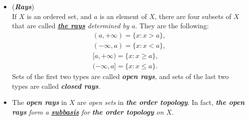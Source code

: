 \documentclass[11pt]{article}
\begin{document}
\begin{itemize}
\item  \begin{definition}(\emph{\textbf{Rays}})\\
If $X$ is an ordered set, and $a$ is an element of $X$, there are four subsets of $X$ that are called \emph{\textbf{\underline{the rays}} determined by $a$}. They are the following:
\begin{align*}
(a, +\infty) = \{x:  x > a\},\\
(-\infty, a) = \{x:  x < a\},\\
[a, +\infty) = \{x: x \ge a\},\\
(-\infty, a]= \{x: x \le a\}.
\end{align*}
Sets of the first two types are called \emph{\textbf{open rays}}, and sets of the last two types are called \emph{\textbf{closed rays}}.
\end{definition}

\item  \begin{remark}
The \emph{\textbf{open rays}} in $X$ are \emph{open sets} in \emph{\textbf{the order topology}}. In fact, \emph{\textbf{the open rays} form a \underline{\textbf{subbasis}} for \textbf{the order topology} on $X$}.
\end{remark}
\end{itemize}
\end{document}

